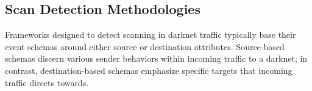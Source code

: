 \documentclass[manuscript,nonacm]{acmart}
\begin{document}


\subsection{Scan Detection Methodologies}

Frameworks designed to detect scanning in darknet traffic typically base their event schemas around either source or destination attributes.
Source-based schemas discern various sender behaviors within incoming traffic to a darknet; in contrast, destination-based schemas emphasize specific targets that incoming traffic directs towards.
\vspace{0.25em}

\end{document}
